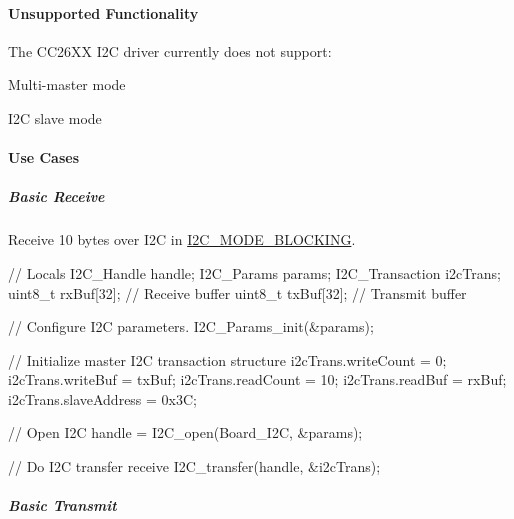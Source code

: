 \paragraph*{Unsupported Functionality}

The C\+C26\+X\+X I2\+C driver currently does not support\+:
\begin{DoxyItemize}
\item Multi-\/master mode
\item I2\+C slave mode
\end{DoxyItemize}

\paragraph*{Use Cases\label{_i2_c_c_c26_x_x_8h_I2C_USE_CASES}%
\hypertarget{_i2_c_c_c26_x_x_8h_I2C_USE_CASES}{}%
}

\subparagraph*{Basic Receive}

Receive 10 bytes over I2\+C in \hyperlink{_i2_c_8h_a39f3b9340fc4ee241b0d2da9b2841c26abe065350be2a0ae5c9beb24624626c75}{I2\+C\+\_\+\+M\+O\+D\+E\+\_\+\+B\+L\+O\+C\+K\+I\+N\+G}. 
\begin{DoxyCode}
\textcolor{comment}{// Locals}
I2C_Handle handle;
I2C_Params params;
I2C_Transaction i2cTrans;
uint8\_t rxBuf[32];      \textcolor{comment}{// Receive buffer}
uint8\_t txBuf[32];      \textcolor{comment}{// Transmit buffer}

\textcolor{comment}{// Configure I2C parameters.}
I2C_Params_init(&params);

\textcolor{comment}{// Initialize master I2C transaction structure}
i2cTrans.writeCount   = 0;
i2cTrans.writeBuf     = txBuf;
i2cTrans.readCount    = 10;
i2cTrans.readBuf      = rxBuf;
i2cTrans.slaveAddress = 0x3C;

\textcolor{comment}{// Open I2C}
handle = I2C_open(Board\_I2C, &params);

\textcolor{comment}{// Do I2C transfer receive}
I2C_transfer(handle, &i2cTrans);
\end{DoxyCode}


\subparagraph*{Basic Transmit}

